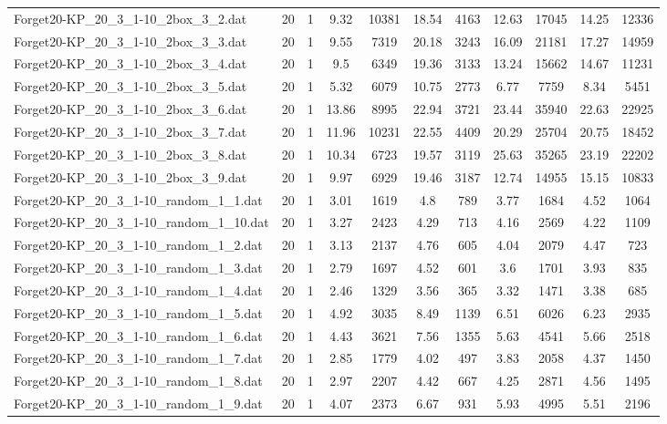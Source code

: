 \begin{table}[!ht]
\begin{tabular}{lcccccccccc}
Forget20-KP\_20\_3\_1-10\_2box\_3\_2.dat & 20 & 1 & 9.32 & 10381 & 18.54 & 4163 & 12.63 & 17045 & 14.25 & 12336 \\
Forget20-KP\_20\_3\_1-10\_2box\_3\_3.dat & 20 & 1 & 9.55 & 7319 & 20.18 & 3243 & 16.09 & 21181 & 17.27 & 14959 \\
Forget20-KP\_20\_3\_1-10\_2box\_3\_4.dat & 20 & 1 & 9.5 & 6349 & 19.36 & 3133 & 13.24 & 15662 & 14.67 & 11231 \\
Forget20-KP\_20\_3\_1-10\_2box\_3\_5.dat & 20 & 1 & 5.32 & 6079 & 10.75 & 2773 & 6.77 & 7759 & 8.34 & 5451 \\
Forget20-KP\_20\_3\_1-10\_2box\_3\_6.dat & 20 & 1 & 13.86 & 8995 & 22.94 & 3721 & 23.44 & 35940 & 22.63 & 22925 \\
Forget20-KP\_20\_3\_1-10\_2box\_3\_7.dat & 20 & 1 & 11.96 & 10231 & 22.55 & 4409 & 20.29 & 25704 & 20.75 & 18452 \\
Forget20-KP\_20\_3\_1-10\_2box\_3\_8.dat & 20 & 1 & 10.34 & 6723 & 19.57 & 3119 & 25.63 & 35265 & 23.19 & 22202 \\
Forget20-KP\_20\_3\_1-10\_2box\_3\_9.dat & 20 & 1 & 9.97 & 6929 & 19.46 & 3187 & 12.74 & 14955 & 15.15 & 10833 \\
Forget20-KP\_20\_3\_1-10\_random\_1\_1.dat & 20 & 1 & 3.01 & 1619 & 4.8 & 789 & 3.77 & 1684 & 4.52 & 1064 \\
Forget20-KP\_20\_3\_1-10\_random\_1\_10.dat & 20 & 1 & 3.27 & 2423 & 4.29 & 713 & 4.16 & 2569 & 4.22 & 1109 \\
Forget20-KP\_20\_3\_1-10\_random\_1\_2.dat & 20 & 1 & 3.13 & 2137 & 4.76 & 605 & 4.04 & 2079 & 4.47 & 723 \\
Forget20-KP\_20\_3\_1-10\_random\_1\_3.dat & 20 & 1 & 2.79 & 1697 & 4.52 & 601 & 3.6 & 1701 & 3.93 & 835 \\
Forget20-KP\_20\_3\_1-10\_random\_1\_4.dat & 20 & 1 & 2.46 & 1329 & 3.56 & 365 & 3.32 & 1471 & 3.38 & 685 \\
Forget20-KP\_20\_3\_1-10\_random\_1\_5.dat & 20 & 1 & 4.92 & 3035 & 8.49 & 1139 & 6.51 & 6026 & 6.23 & 2935 \\
Forget20-KP\_20\_3\_1-10\_random\_1\_6.dat & 20 & 1 & 4.43 & 3621 & 7.56 & 1355 & 5.63 & 4541 & 5.66 & 2518 \\
Forget20-KP\_20\_3\_1-10\_random\_1\_7.dat & 20 & 1 & 2.85 & 1779 & 4.02 & 497 & 3.83 & 2058 & 4.37 & 1450 \\
Forget20-KP\_20\_3\_1-10\_random\_1\_8.dat & 20 & 1 & 2.97 & 2207 & 4.42 & 667 & 4.25 & 2871 & 4.56 & 1495 \\
Forget20-KP\_20\_3\_1-10\_random\_1\_9.dat & 20 & 1 & 4.07 & 2373 & 6.67 & 931 & 5.93 & 4995 & 5.51 & 2196 \\

\end{tabular}
\end{table}
